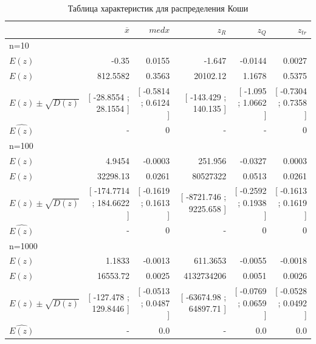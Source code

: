 \documentclass[a4paper,14pt]{article}
\begin{document}
	\begin{table}[H]
		\centering
		\begin{tabular}[t]{|l|r|r|r|r|r|}
			\hline
			& $\overline{x}$ & $med x$ & $z_R$ & $z_Q$ & $z_{tr}$\\\hline\hline
			n=10 & & & & &\\\hline
			$E(z)$  & -0.35 & 0.0155 & -1.647 & -0.0144 & 0.0027  \\\hline
$E(z)$  & 812.5582 & 0.3563 & 20102.12 & 1.1678 & 0.5375  \\\hline
$E(z)  \pm  \sqrt{D(z)}$  & [ -28.8554 ; 28.1554 ] & [ -0.5814 ; 0.6124 ] & [ -143.429 ; 140.135 ] & [ -1.095 ; 1.0662 ] & [ -0.7304 ; 0.7358 ]  \\\hline
			$\hat{E(z)}$ & - & 0 & - & - & 0\\\hline
			
			n=100 & & & & &\\\hline
			$E(z)$  & 4.9454 & -0.0003 & 251.956 & -0.0327 & 0.0003  \\\hline
$E(z)$  & 32298.13 & 0.0261 & 80527322 & 0.0513 & 0.0261  \\\hline
$E(z)  \pm  \sqrt{D(z)}$  & [ -174.7714 ; 184.6622 ] & [ -0.1619 ; 0.1613 ] & [ -8721.746 ; 9225.658 ] & [ -0.2592 ; 0.1938 ] & [ -0.1613 ; 0.1619 ]  \\\hline
			$\hat{E(z)}$ & - & 0 & - & 0 & 0\\\hline
			
			n=1000 & & & & &\\\hline
			$E(z)$  & 1.1833 & -0.0013 & 611.3653 & -0.0055 & -0.0018  \\\hline
$E(z)$  & 16553.72 & 0.0025 & 4132734206 & 0.0051 & 0.0026  \\\hline
$E(z)  \pm  \sqrt{D(z)}$  & [ -127.478 ; 129.8446 ] & [ -0.0513 ; 0.0487 ] & [ -63674.98 ; 64897.71 ] & [ -0.0769 ; 0.0659 ] & [ -0.0528 ; 0.0492 ]  \\\hline
			$\hat{E(z)}$ & - & 0.0 & - & 0.0 & 0.0\\\hline
			
		\end{tabular}
		\caption{Таблица характеристик для распределения Коши}
		\label{tab:cauchy}
	\end{table}
	
\end{document}
